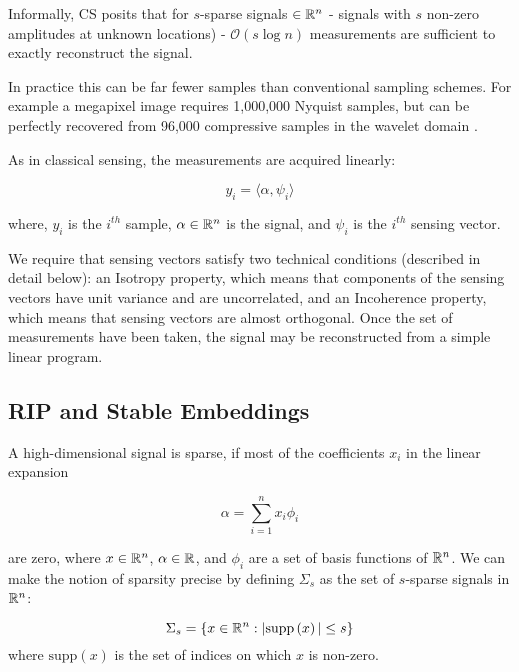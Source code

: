 Informally, CS posits that for \(s\)-sparse signals \(\in {\mathbb{R}}^{n}\) - signals with \(s\) non-zero amplitudes at unknown locations) - \(\mathcal{O}(s\log{n})\) measurements are sufficient to exactly reconstruct the signal.

In practice this can be far fewer samples than conventional sampling schemes. For example a megapixel image requires 1,000,000 Nyquist samples, but can be perfectly recovered from 96,000 compressive samples in the wavelet domain \cite{watkincandes}. 

As in classical sensing, the measurements are acquired linearly:

\begin{equation}
y_i = \langle \alpha, \psi_i \rangle
\end{equation}

where, \(y_i\) is the \(i^{th}\) sample, \(\alpha \in {\mathbb{R}}^n\) is the signal, and \(\psi_i\) is the \(i^{th}\) sensing vector.

We require that sensing vectors satisfy two technical conditions (described in detail below): an Isotropy property, which means that components of the sensing vectors have unit variance and are uncorrelated, and an Incoherence property, which means that sensing vectors are almost orthogonal. Once the set of measurements have been taken, the signal may be reconstructed from a simple linear program.

\subsection{RIP and Stable Embeddings}

A high-dimensional signal is sparse, if most of the coefficients \(x_i\) in the linear expansion 

\begin{equation}
\alpha = \sum	_{i=1}^{n} x_i \phi_i
\end{equation}

are zero, where \(x \in {\mathbb{R}}^n\), \(\alpha \in {\mathbb{R}}\), and \(\phi_i\) are a set of basis functions of \({\mathbb{R}}^n\). We can make the notion of sparsity precise by defining \(\Sigma_s\) as the set of \(s\)-sparse signals in \({\mathbb{R}}^n\):

\begin{definition}
\begin{equation}
\Sigma_s = \{ x \in {\mathbb{R}}^n : |\mathrm{supp} \left(x\right) |\leq s\}
\end{equation}
where \(\mathrm{supp}\left(x\right) \) is the set of indices on which \(x\) is non-zero.
\end{definition}

